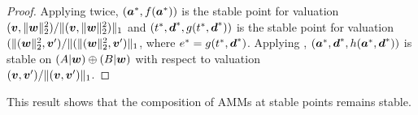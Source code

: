 \begin{proof}
Applying  twice,
$(\ba^{*},f(\ba^{*}))$ is the stable point for valuation
$(\bv,\|\bw\|_2^2) / \|(\bv,\|\bw\|_2^2)\|_1$
and $(t^{*},\bd^{*},g(t^{*},\bd^{*}))$ is the stable point for valuation
$(\|(\bw\|_2^2,\bv') / \|(\|(\bw\|_2^2,\bv')\|_1$,
where $e^{*} = g(t^{*},\bd^{*})$.
Applying ,
$(\ba^{*},\bd^{*},h(\ba^{*},\bd^{*}))$ is stable on $(A | \bw) \oplus (B | \bw)$ with respect to
valuation \\ $(\bv,\bv')/ \|(\bv,\bv')\|_1$.
   
\end{proof}
This result shows that the composition of AMMs at stable points remains stable.


